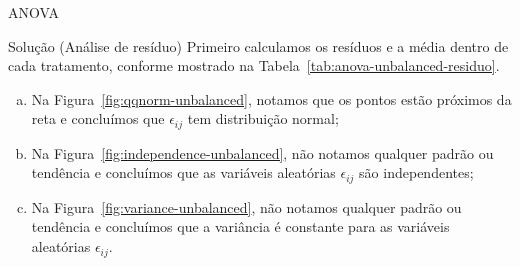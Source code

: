 \documentclass[8pt]{beamer}
\begin{document}
\begin{frame}{ANOVA}

\begin{block}{Solução (Análise de resíduo)}
	Primeiro calculamos os resíduos e a média dentro de cada tratamento, conforme mostrado na Tabela~\ref{tab:anova-unbalanced-residuo}.
	\begin{table}[htbp]
		\centering
		\caption{Informações do experimento.}
		\label{tab:anova-unbalanced-residuo}
	\end{table}

	\begin{enumerate}[(a)]
		\item Na Figura~\ref{fig:qqnorm-unbalanced}, notamos que os pontos estão próximos da reta e concluímos que $\epsilon_{ij}$ tem distribuição normal;
		\item Na Figura~\ref{fig:independence-unbalanced}, não notamos qualquer padrão ou tendência e concluímos que as variáveis aleatórias $\epsilon_{ij}$ são independentes;
		\item Na Figura~\ref{fig:variance-unbalanced}, não notamos qualquer padrão ou tendência e concluímos que a variância é constante para as variáveis aleatórias $\epsilon_{ij}$.
	\end{enumerate}
\end{block}

\end{frame}
\end{document}
